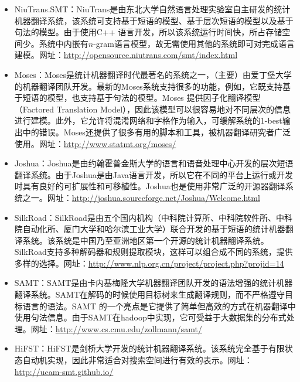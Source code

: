 \begin{itemize}
\vspace{0.5em}
\item NiuTrans.SMT：NiuTrans\cite{Tong2012NiuTrans}是由东北大学自然语言处理实验室自主研发的统计机器翻译系统，该系统可支持基于短语的模型、基于层次短语的模型以及基于句法的模型。由于使用C++ 语言开发，所以该系统运行时间快，所占存储空间少。系统中内嵌有$n$-gram语言模型，故无需使用其他的系统即可对完成语言建模。网址：\url{http://opensource.niutrans.com/smt/index.html}
\vspace{0.5em}
\item Moses：Moses\cite{Koehn2007Moses}是统计机器翻译时代最著名的系统之一，（主要）由爱丁堡大学的机器翻译团队开发。最新的Moses系统支持很多的功能，例如，它既支持基于短语的模型，也支持基于句法的模型。Moses 提供因子化翻译模型（Factored Translation Model），因此该模型可以很容易地对不同层次的信息进行建模。此外，它允许将混淆网络和字格作为输入，可缓解系统的1-best输出中的错误。Moses还提供了很多有用的脚本和工具，被机器翻译研究者广泛使用。网址：\url{http://www.statmt.org/moses/}
\vspace{0.5em}
\item Joshua：Joshua\cite{Li2010Joshua}是由约翰霍普金斯大学的语言和语音处理中心开发的层次短语翻译系统。由于Joshua是由Java语言开发，所以它在不同的平台上运行或开发时具有良好的可扩展性和可移植性。Joshua也是使用非常广泛的开源器翻译系统之一。网址：\url{http://joshua.sourceforge.net/Joshua/Welcome.html}
\vspace{0.5em}
\item SilkRoad：SilkRoad是由五个国内机构（中科院计算所、中科院软件所、中科院自动化所、厦门大学和哈尔滨工业大学）联合开发的基于短语的统计机器翻译系统。该系统是中国乃至亚洲地区第一个开源的统计机器翻译系统。SilkRoad支持多种解码器和规则提取模块，这样可以组合成不同的系统，提供多样的选择。网址：\url{http://www.nlp.org.cn/project/project.php?projid=14}
\vspace{0.5em}
\item SAMT：SAMT\cite{zollmann2007the}是由卡内基梅隆大学机器翻译团队开发的语法增强的统计机器翻译系统。SAMT在解码的时候使用目标树来生成翻译规则，而不严格遵守目标语言的语法。SAMT 的一个亮点是它提供了简单但高效的方式在机器翻译中使用句法信息。由于SAMT在hadoop中实现，它可受益于大数据集的分布式处理。网址：\url{http://www.cs.cmu.edu/zollmann/samt/}
\vspace{0.5em}
\item HiFST：HiFST\cite{iglesias2009hierarchical}是剑桥大学开发的统计机器翻译系统。该系统完全基于有限状态自动机实现，因此非常适合对搜索空间进行有效的表示。网址：\url{http://ucam-smt.github.io/}

\end{itemize}

